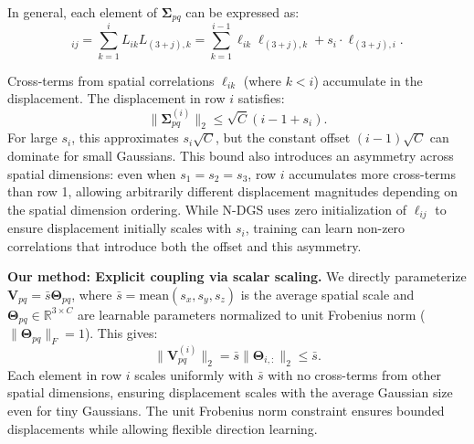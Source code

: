 \documentclass{article}
\theoremstyle{plain}
\theoremstyle{definition}
\theoremstyle{remark}
\begin{document}
In general, each element of $\boldsymbol{\Sigma}_{pq}$ can be expressed as:
\begin{equation}
[\boldsymbol{\Sigma}_{pq}]_{ij} = \sum_{k=1}^{i} L_{ik} L_{(3+j),k} = \sum_{k=1}^{i-1} \ell_{ik} \ell_{(3+j),k} + s_i \cdot \ell_{(3+j),i}.
\end{equation}

Cross-terms from spatial correlations $\ell_{ik}$ (where $k < i$) accumulate in the displacement. The displacement in row $i$ satisfies:
\begin{equation}
\|\boldsymbol{\Sigma}_{pq}^{(i)}\|_2 \leq \sqrt{C}(i-1 + s_i).
\end{equation}
For large $s_i$, this approximates $s_i \sqrt{C}$, but the constant offset $(i-1)\sqrt{C}$ can dominate for small Gaussians. This bound also introduces an asymmetry across spatial dimensions: even when $s_1 = s_2 = s_3$, row $i$ accumulates more cross-terms than row 1, allowing arbitrarily different displacement magnitudes depending on the spatial dimension ordering. While N-DGS uses zero initialization of $\ell_{ij}$ to ensure displacement initially scales with $s_i$, training can learn non-zero correlations that introduce both the offset and this asymmetry.

\textbf{Our method: Explicit coupling via scalar scaling.} We directly parameterize $\mathbf{V}_{pq} = \bar{s} \boldsymbol{\Theta}_{pq}$, where $\bar{s} = \text{mean}(s_x, s_y, s_z)$ is the average spatial scale and $\boldsymbol{\Theta}_{pq} \in \mathbb{R}^{3 \times C}$ are learnable parameters normalized to unit Frobenius norm ($\|\boldsymbol{\Theta}_{pq}\|_F = 1$). This gives:
\begin{equation}
\|\mathbf{V}_{pq}^{(i)}\|_2 = \bar{s} \|\boldsymbol{\Theta}_{i,:}\|_2 \leq \bar{s}.
\end{equation}
Each element in row $i$ scales uniformly with $\bar{s}$ with no cross-terms from other spatial dimensions, ensuring displacement scales with the average Gaussian size even for tiny Gaussians. The unit Frobenius norm constraint ensures bounded displacements while allowing flexible direction learning.
\end{document}
